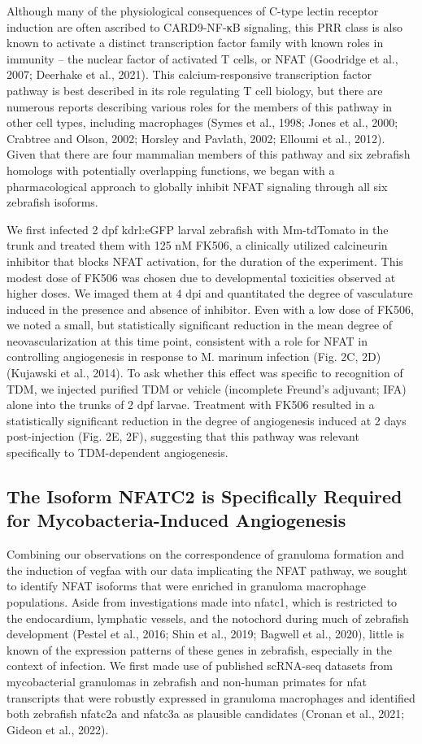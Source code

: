 Although many of the physiological consequences of C-type lectin receptor induction are often ascribed to CARD9-NF-κB signaling, this PRR class is also known to activate a distinct transcription factor family with known roles in immunity – the nuclear factor of activated T cells, or NFAT (Goodridge et al., 2007; Deerhake et al., 2021). This calcium-responsive transcription factor pathway is best described in its role regulating T cell biology, but there are numerous reports describing various roles for the members of this pathway in other cell types, including macrophages (Symes et al., 1998; Jones et al., 2000; Crabtree and Olson, 2002; Horsley and Pavlath, 2002; Elloumi et al., 2012). Given that there are four mammalian members of this pathway and six zebrafish homologs with potentially overlapping functions, we began with a pharmacological approach to globally inhibit NFAT signaling through all six zebrafish isoforms. 

We first infected 2 dpf kdrl:eGFP larval zebrafish with Mm-tdTomato in the trunk and treated them with 125 nM FK506, a clinically utilized calcineurin inhibitor that blocks NFAT activation, for the duration of the experiment. This modest dose of FK506 was chosen due to developmental toxicities observed at higher doses. We imaged them at 4 dpi and quantitated the degree of vasculature induced in the presence and absence of inhibitor. Even with a low dose of FK506, we noted a small, but statistically significant reduction in the mean degree of neovascularization at this time point, consistent with a role for NFAT in controlling angiogenesis in response to M. marinum infection (Fig. 2C, 2D) (Kujawski et al., 2014). To ask whether this effect was specific to recognition of TDM, we injected purified TDM or vehicle (incomplete Freund’s adjuvant; IFA) alone into the trunks of 2 dpf larvae. Treatment with FK506 resulted in a statistically significant reduction in the degree of angiogenesis induced at 2 days post-injection (Fig. 2E, 2F), suggesting that this pathway was relevant specifically to TDM-dependent angiogenesis.

\subsection{The Isoform NFATC2 is Specifically Required for Mycobacteria-Induced Angiogenesis}

Combining our observations on the correspondence of granuloma formation and the induction of vegfaa with our data implicating the NFAT pathway, we sought to identify NFAT isoforms that were enriched in granuloma macrophage populations. Aside from investigations made into nfatc1, which is restricted to the endocardium, lymphatic vessels, and the notochord during much of zebrafish development (Pestel et al., 2016; Shin et al., 2019; Bagwell et al., 2020), little is known of the expression patterns of these genes in zebrafish, especially in the context of infection. We first made use of published scRNA-seq datasets from mycobacterial granulomas in zebrafish and non-human primates for nfat transcripts that were robustly expressed in granuloma macrophages and identified both zebrafish nfatc2a and nfatc3a as plausible candidates (Cronan et al., 2021; Gideon et al., 2022).

